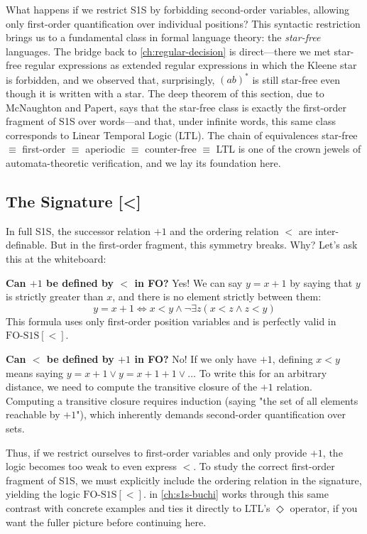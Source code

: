 What happens if we restrict S1S by forbidding second-order variables, allowing only first-order quantification over individual positions? This syntactic restriction brings us to a fundamental class in formal language theory: the \emph{star-free} languages. The bridge back to \cref{ch:regular-decision} is direct---there we met star-free regular expressions as extended regular expressions in which the Kleene star is forbidden, and we observed that, surprisingly, $(ab)^*$ is still star-free even though it is written with a star. The deep theorem of this section, due to McNaughton and Papert, says that the star-free class is exactly the first-order fragment of S1S over words---and that, under infinite words, this same class corresponds to Linear Temporal Logic (LTL). The chain of equivalences star-free $\equiv$ first-order $\equiv$ aperiodic $\equiv$ counter-free $\equiv$ LTL is one of the crown jewels of automata-theoretic verification, and we lay its foundation here.

\subsection{The Signature [<]}
\label{subsec:signature-fo}

In full S1S, the successor relation $+1$ and the ordering relation $<$ are inter-definable. But in the first-order fragment, this symmetry breaks. Why? Let's ask this at the whiteboard:

\textbf{Can $+1$ be defined by $<$ in FO?}
Yes! We can say $y = x+1$ by saying that $y$ is strictly greater than $x$, and there is no element strictly between them:
$$y = x + 1 \iff x < y \land \neg \exists z (x < z \land z < y)$$
This formula uses only first-order position variables and is perfectly valid in $\text{FO-S1S}[<]$.

\textbf{Can $<$ be defined by $+1$ in FO?}
No! If we only have $+1$, defining $x < y$ means saying $y = x+1 \lor y = x+1+1 \lor \dots$ To write this for an arbitrary distance, we need to compute the transitive closure of the $+1$ relation. Computing a transitive closure requires induction (saying "the set of all elements reachable by $+1$"), which inherently demands second-order quantification over sets.

Thus, if we restrict ourselves to first-order variables and only provide $+1$, the logic becomes too weak to even express $<$. To study the correct first-order fragment of S1S, we must explicitly include the ordering relation in the signature, yielding the logic $\text{FO-S1S}[<]$.  in \cref{ch:s1s-buchi} works through this same contrast with concrete examples and ties it directly to LTL's $\Diamond$ operator, if you want the fuller picture before continuing here.

